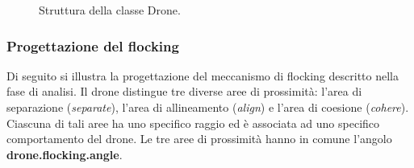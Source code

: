 \begin{figure}[H] 
    \captionsetup{justification=centering, margin=2cm, font=footnotesize}
    \begin{center}
    \end{center}
    \caption[short]{Struttura della classe Drone.}
    \label{classe_drone}
\end{figure}

\subsubsection{Progettazione del flocking}

Di seguito si illustra la progettazione del meccanismo di flocking descritto nella fase di analisi. 
Il drone distingue tre diverse aree di prossimità: l’area di separazione (\textit{separate}), l’area di allineamento (\textit{align}) e l’area di coesione (\textit{cohere}). 
Ciascuna di tali aree ha uno specifico raggio ed è associata ad uno specifico comportamento del drone.
Le tre aree di prossimità hanno in comune l’angolo \textbf{drone.flocking.angle}.


